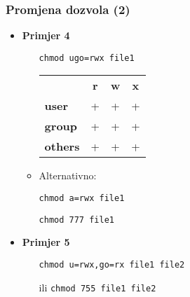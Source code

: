 \documentclass[table,usenames,dvipsnames] {beamer}
\newcommand{\shell}[1]{\texttt{#1}}
\begin{document}
\begin{frame}[t]
\frametitle{Promjena dozvola (2)}
\begin{itemize}
  \item \textbf{Primjer 4}
  \begin{itemize}
    \item[] \shell{chmod ugo=rwx file1}
    \item[] \hspace{1em} \begin{tabular}{l c c c}
      & \textbf{r} & \textbf{w} & \textbf{x}\\
      \textbf{user} & + & + & +\\
      \textbf{group} & + & + & +\\
      \textbf{others} & + & + & +
    \end{tabular}
    \item \vspace{1em} Alternativno:
    \item[] \shell{chmod a=rwx file1}
    \item[] \shell{chmod 777 file1}
  \end{itemize}
\end{itemize}
\begin{itemize}
  \item \textbf{Primjer 5}
    \begin{itemize}
      \item[] \shell{chmod u=rwx,go=rx file1 file2}
      \item[ili] \shell{chmod 755 file1 file2}
  \end{itemize}
\end{itemize}
\end{frame}
\end{document}
